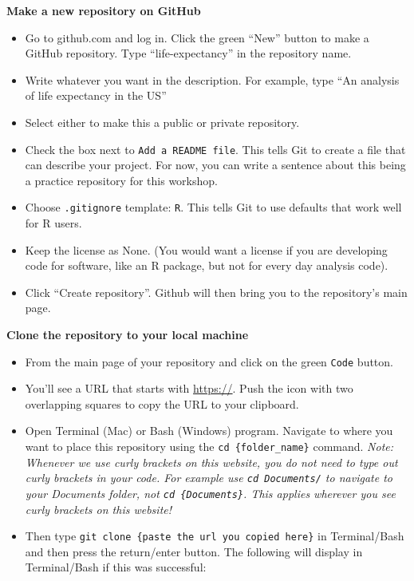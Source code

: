 \documentclass[
]{book}
\providecommand{\tightlist}{%
  \setlength{\itemsep}{0pt}\setlength{\parskip}{0pt}}
\begin{document}
\textbf{Make a new repository on GitHub}

\begin{itemize}
\tightlist
\item
  Go to github.com and log in. Click the green ``New'' button to make a GitHub
  repository. Type ``life-expectancy'' in the repository name.
\item
  Write whatever you want in the description. For example, type ``An analysis of life expectancy in the US''
\item
  Select either to make this a public or private repository.
\item
  Check the box next to \texttt{Add\ a\ README\ file}. This tells Git to create a file that can describe your project. For now, you can write a sentence about this being a practice repository for this workshop.\\
\item
  Choose \texttt{.gitignore} template: \texttt{R}. This tells Git to use defaults that work well for R users.\\
\item
  Keep the license as None. (You would want a license if you are developing code for software, like an R package, but not for every day analysis code).
\item
  Click ``Create repository''. Github will then bring you to the repository's
  main page.
\end{itemize}

\textbf{Clone the repository to your local machine}

\begin{itemize}
\tightlist
\item
  From the main page of your repository and click on the green \texttt{Code} button.\\
\item
  You'll see a URL that starts with \url{https://}. Push the icon with two overlapping
  squares to copy the URL to your clipboard.
\item
  Open Terminal (Mac) or Bash (Windows) program. Navigate to where you want to place
  this repository using the \texttt{cd\ \{folder\_name\}} command. \emph{Note: Whenever we use curly brackets on this website, you do not need to type out curly brackets in your code. For example use \texttt{cd\ Documents/} to navigate to your Documents folder, not \texttt{cd\ \{Documents\}}. This applies wherever you see curly brackets on this website!}
\item
  Then type \texttt{git\ clone\ \{paste\ the\ url\ you\ copied\ here\}} in Terminal/Bash and
  then press the return/enter button. The following will display in Terminal/Bash
  if this was successful:
\end{itemize}
\end{document}
